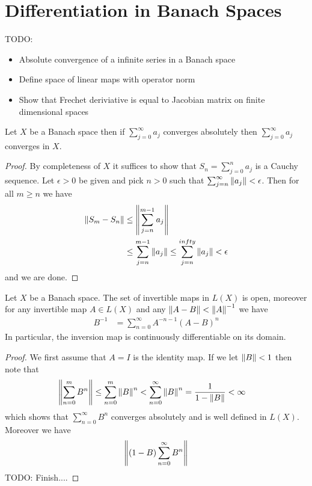 \section{Differentiation in Banach Spaces}

TODO:
\begin{itemize}
\item Absolute convergence of a infinite series in a Banach space
\item Define space of linear maps with operator norm
\item Show that Frechet deriviative is equal to Jacobian matrix on
  finite dimensional spaces
\end{itemize}

\begin{prop}Let $X$ be a Banach space then if $\sum_{j=0}^\infty a_j$
  converges absolutely then $\sum_{j=0}^\infty a_j$ converges in $X$.
\end{prop}
\begin{proof}
By completeness of $X$ it suffices to show that $S_n = \sum_{j=0}^n
a_j$ is a Cauchy sequence.  Let $\epsilon > 0$ be given and pick $n >
0$ such that $\sum_{j=n}^\infty \left \lVert a_j \right \rVert < \epsilon$.  Then for all
$m \geq n$ we have
\begin{align*}
\left \lVert S_m - S_n \right \rVert &\leq \left \lVert \sum_{j=n}^{m-1} a_j \right \rVert \\
&\leq \sum_{j=n}^{m-1}\left \lVert  a_j \right \rVert \leq \sum_{j=n}^{infty}\left \lVert  a_j \right \rVert < \epsilon
\end{align*}
and we are done.
\end{proof}

\begin{prop}Let $X$ be a Banach space.  The set of invertible maps in $L(X)$ is open, moreover
  for any invertible map $A \in L(X)$ and any $\left \lVert A-B \right \rVert <
  \left \lVert A \right \rVert^{-1}$ we have 
\begin{align*}
B^{-1} &= \sum_{n=0}^\infty A^{-n-1} (A-B)^n 
\end{align*}
In particular, the inversion map is continuously differentiable on its domain.
\end{prop}
\begin{proof}
We first assume that $A= I$ is the identity map.  If we let $\left \lVert B \right \rVert
< 1$ then note that 
\begin{align*}
\left \lVert \sum_{n=0}^m B^n \right \rVert &\leq \sum_{n=0}^m \left \lVert  B \right \rVert^n <
                          \sum_{n=0}^\infty \left \lVert  B \right \rVert^n =
                          \frac{1}{1-\left \lVert B \right \rVert} < \infty
\end{align*}
which shows that $\sum_{n=0}^\infty B^n$ converges absolutely and
is well defined in $L(X)$.  Moreover we have
\begin{align*}
\left \lVert (1- B) \sum_{n=0}^\infty B^n  \right \rVert
\end{align*}
TODO: Finish....
\end{proof}

